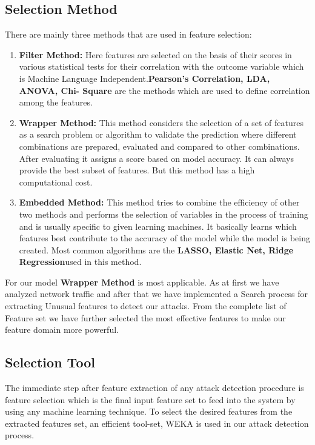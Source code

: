 \subsection{Selection Method}
There are mainly three methods that are used in feature selection:
\begin{enumerate}
    \item \textbf{Filter Method:} Here features are selected on the basis of their scores in various statistical tests for their correlation with the outcome variable which is Machine Language Independent.\textbf{Pearson’s Correlation, LDA, ANOVA, Chi- Square}  are the methods which are used to define correlation among the features.
    \item \textbf{Wrapper Method:} This method considers the selection of a set of features as a search problem or algorithm to validate the prediction where different combinations are prepared, evaluated and compared to other combinations. After evaluating it assigns a score based on model accuracy. It can always provide the best subset of features. But this method has a high computational cost.
    \item \textbf{Embedded Method:} This method tries to combine the efficiency of other two methods and performs the selection of variables in the process of training and is usually specific to given learning machines. It basically learns which features best contribute to the accuracy of the model while the model is being created. Most common algorithms are the \textbf{LASSO, Elastic Net, Ridge Regression}used in this method.
\end{enumerate}

For our model \textbf{Wrapper Method} is most applicable. As at first we have analyzed network traffic and after that we have implemented a Search process for extracting Unusual features to detect our attacks. From the complete list of Feature set we have further selected the most effective features to make our feature domain more powerful.

\subsection{Selection Tool}
The immediate step after feature extraction of any attack detection procedure is feature selection which is the final input feature set to feed into the system by using any machine learning technique. To select the desired features from the extracted features set, an efficient tool-set, WEKA is used in our attack detection process.

